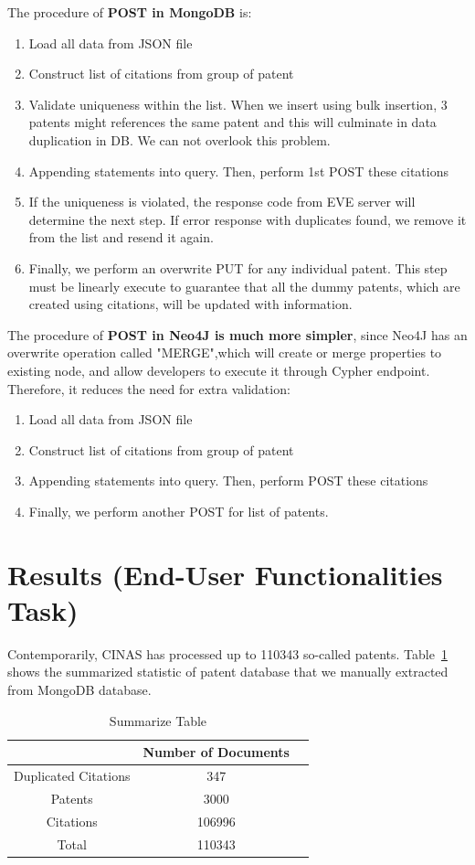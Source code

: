 \documentclass{article}
\begin{document}
The procedure of \textbf{POST in MongoDB} is:
\begin{enumerate}
 \item Load all data from JSON file
 \item Construct list of citations from group of patent
 \item Validate uniqueness within the list. When we insert using bulk insertion, 3 patents might references the same patent and this will culminate in data duplication in DB. We can not overlook this problem.
 \item Appending statements into query. Then, perform 1st POST these citations 
 \item If the uniqueness is violated, the response code from EVE server will determine the next step. If error response with duplicates found, we remove it from the list and resend it again.
 \item Finally, we perform an overwrite PUT for any individual patent. This step must be linearly execute to guarantee that all the dummy patents, which are created using citations, will be updated with information.
\end{enumerate}

The procedure of \textbf{POST in Neo4J is much more simpler}, since Neo4J has an overwrite operation called "MERGE",which will create or merge properties to existing node, and allow developers to execute it through Cypher endpoint. Therefore, it reduces the need for extra validation:
\begin{enumerate}
 \item Load all data from JSON file
 \item Construct list of citations from group of patent
 \item Appending statements into query. Then, perform POST these citations 
 \item Finally, we perform another POST for list of patents.
\end{enumerate}


\section{Results (End-User Functionalities Task)}
Contemporarily, CINAS has processed up to 110343 so-called patents. Table~\ref{table:summarize} shows the summarized statistic of patent database that we manually extracted from MongoDB database.
\begin{table}[!h]
\begin{center}
\begin{tabular}{|c|c|l|} \hline
 &Number of Documents\\ \hline
 Duplicated Citations&347 \\ \hline
Patents&3000 \\ \hline
Citations&106996 \\ \hline
Total & 110343\\ \hline
\end{tabular}
\end{center}
\caption{Summarize Table} \label{table:summarize}
\end{table}
\end{document}
